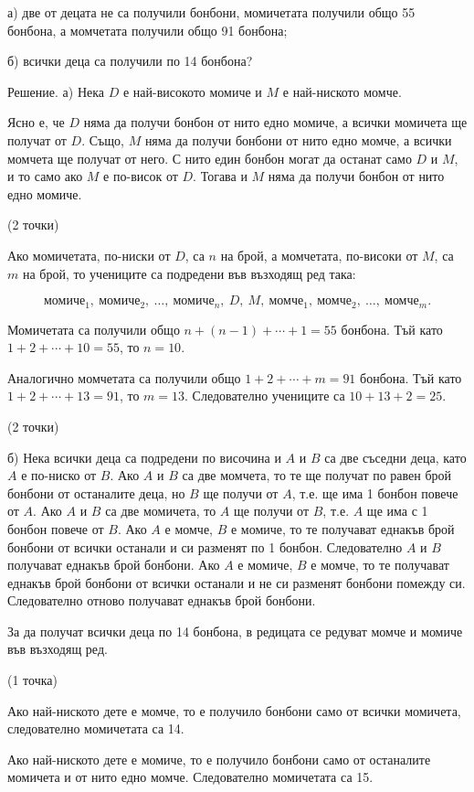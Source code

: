 а) две от децата не са получили бонбони, момичетата получили общо 55 бонбона, а момчетата получили общо 91 бонбона;

б) всички деца са получили по 14 бонбона?

Решение. а) Нека $D$ е най-високото момиче и $M$ е най-ниското момче.

Ясно е, че $D$ няма да получи бонбон от нито едно момиче, а всички момичета ще получат от $D$. Също, $M$ няма да получи бонбони от нито едно момче, а всички момчета ще получат от него. С нито един бонбон могат да останат само $D$ и $M$, и то само ако $M$ е по-висок от $D$. Тогава и $M$ няма да получи бонбон от нито едно момиче.

(2 точки)

Ако момичетата, по-ниски от $D$, са $n$ на брой, а момчетата, по-високи от $M$, са $m$ на брой, то учениците са подредени във възходящ ред така:

$$\text{момиче}_1,\ \text{момиче}_2,\ \ldots,\ \text{момиче}_n,\ D,\ M,\ \text{момче}_1,\ \text{момче}_2,\ \ldots,\ \text{момче}_m.$$

Момичетата са получили общо $n+(n-1)+\cdots+1=55$ бонбона. Тъй като $1+2+\cdots+10=55$, то $n=10$.

Аналогично момчетата са получили общо $1+2+\cdots+m=91$ бонбона. Тъй като $1+2+\cdots+13=91$, то $m=13$. Следователно учениците са $10+13+2=25$.

(2 точки)

б) Нека всички деца са подредени по височина и $A$ и $B$ са две съседни деца, като $A$ е по-ниско от $B$. Ако $A$ и $B$ са две момчета, то те ще получат по равен брой бонбони от останалите деца, но $B$ ще получи от $A$, т.е. ще има 1 бонбон повече от $A$. Ако $A$ и $B$ са две момичета, то $A$ ще получи от $B$, т.е. $A$ ще има с 1 бонбон повече от $B$. Ако $A$ е момче, $B$ е момиче, то те получават еднакъв брой бонбони от всички останали и си разменят по 1 бонбон. Следователно $A$ и $B$ получават еднакъв брой бонбони. Ако $A$ е момиче, $B$ е момче, то те получават еднакъв брой бонбони от всички останали и не си разменят бонбони помежду си. Следователно отново получават еднакъв брой бонбони.

За да получат всички деца по 14 бонбона, в редицата се редуват момче и момиче във възходящ ред.

(1 точка)

Ако най-ниското дете е момче, то е получило бонбони само от всички момичета, следователно момичетата са 14.

Ако най-ниското дете е момиче, то е получило бонбони само от останалите момичета и от нито едно момче. Следователно момичетата са 15.

